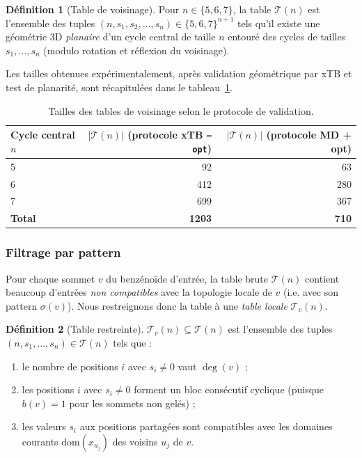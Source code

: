 \documentclass[12pt,a4paper]{article}
\theoremstyle{definition}
\newtheorem{definition}{D\'efinition}[section]
\theoremstyle{remark}
\newcommand{\degv}{\deg(v)}
\newcommand{\dom}{\mathrm{dom}}
\begin{document}
\begin{definition}[Table de voisinage]
Pour $n \in \{5, 6, 7\}$, la table $\mathcal{T}(n)$ est l'ensemble des
tuples $(n, s_1, s_2, \ldots, s_n) \in \{5,6,7\}^{n+1}$ tels qu'il existe
une g\'eom\'etrie 3D \emph{planaire} d'un cycle central de taille $n$
entour\'e des cycles de tailles $s_1, \ldots, s_n$ (modulo rotation et
r\'eflexion du voisinage).
\end{definition}

Les tailles obtenues exp\'erimentalement, apr\`es validation
g\'eom\'etrique par xTB et test de planarit\'e, sont r\'ecapitul\'ees dans
le tableau~\ref{tab:tables-tailles}.

\begin{table}[!ht]
\centering
\renewcommand{\arraystretch}{1.2}
\begin{tabular}{lrr}
\toprule
Cycle central $n$ & $|\mathcal{T}(n)|$ (protocole xTB \texttt{--opt}) & $|\mathcal{T}(n)|$ (protocole MD + opt) \\
\midrule
5 &  92 &  63 \\
6 & 412 & 280 \\
7 & 699 & 367 \\
\midrule
\textbf{Total} & \textbf{1203} & \textbf{710} \\
\bottomrule
\end{tabular}
\caption{Tailles des tables de voisinage selon le protocole de validation.}
\label{tab:tables-tailles}
\end{table}

\subsubsection{Filtrage par pattern}

Pour chaque sommet $v$ du benz\'eno\"ide d'entr\'ee, la table \og
brute \fg{} $\mathcal{T}(n)$ contient beaucoup d'entr\'ees \emph{non
compatibles} avec la topologie locale de $v$ (i.e. avec son pattern
$\sigma(v)$). Nous restreignons donc la table \`a une \emph{table
locale} $\mathcal{T}_v(n)$.

\begin{definition}[Table restreinte]
$\mathcal{T}_v(n) \subseteq \mathcal{T}(n)$ est l'ensemble des tuples
$(n, s_1, \ldots, s_n) \in \mathcal{T}(n)$ tels que :
\begin{enumerate}[label=(\roman*)]
  \item le nombre de positions $i$ avec $s_i \neq 0$ vaut $\degv$ ;
  \item les positions $i$ avec $s_i \neq 0$ forment un bloc consécutif
        cyclique (puisque $b(v) = 1$ pour les sommets non gel\'es) ;
  \item les valeurs $s_i$ aux positions partag\'ees sont compatibles avec
        les domaines courants $\dom(x_{u_j})$ des voisins $u_j$ de $v$.
\end{enumerate}
\end{definition}
\end{document}

